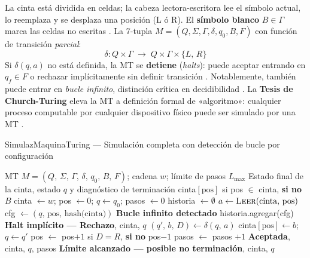 La cinta está dividida en celdas; la cabeza lectora-escritora lee el símbolo actual, lo
reemplaza y se desplaza una posición (L ó R). El \textbf{símbolo blanco} $B \in \Gamma$ marca
las celdas no escritas \cite{kelley2001}. La 7-tupla $M = (Q,\Sigma,\Gamma,\delta,q_0,B,F)$
con función de transición \emph{parcial}:
\[
  \delta: Q \times \Gamma \;\longrightarrow\; Q \times \Gamma \times \{L,\,R\}
\]
Si $\delta(q,a)$ no está definida, la MT se \textbf{detiene} (\emph{halts}): puede aceptar
entrando en $q_f \in F$ o rechazar implícitamente sin definir transición \cite{hopcroft2007es}.
Notablemente, también puede entrar en \emph{bucle infinito}, distinción crítica en decidibilidad
\cite{eugene2008}. La \textbf{Tesis de Church-Turing} eleva la MT a definición formal de
«algoritmo»: cualquier proceso computable por cualquier dispositivo físico puede ser simulado
por una MT \cite{sipser2012}.

\newpage
\begin{algobox}{SimulazMaquinaTuring — Simulación completa con detección de bucle por configuración}
\begin{algorithmic}[1]
  \Require MT $M = (Q,\,\Sigma,\,\Gamma,\,\delta,\,q_0,\,B,\,F)$;\;
           cadena $w$;\; límite de pasos $L_{\max}$
  \Ensure  Estado final de la cinta, estado $q$ y diagnóstico de terminación
  \State
    \State \Return cinta$[\text{pos}]$ si pos $\in$ cinta, \textbf{si no} $B$
  \EndFunction
  \State
  \State cinta $\gets w$;\; pos $\gets 0$;\; $q \gets q_0$;\; pasos $\gets 0$
  \State historia $\gets \emptyset$ 
    \State $a \gets \Call{Leer}{\text{cinta},\, \text{pos}}$
    \State cfg $\gets (q,\, \text{pos},\, \text{hash(cinta)})$
      \State \Return \textbf{Bucle infinito detectado} 
    \EndIf
    \State historia.agregar(cfg)
      \State \Return \textbf{Halt implícito — Rechazo}, cinta, $q$
    \EndIf
    \State $(q',\, b,\, D) \gets \delta(q,\, a)$
    \State cinta$[\text{pos}] \gets b$;\quad $q \gets q'$
    \State pos $\gets$ pos$+1$ si $D = R$, \textbf{si no} pos$-1$
    \State pasos $\gets$ pasos $+ 1$
  \EndWhile
  \State
    \State \Return \textbf{Aceptada}, cinta, $q$, pasos
  \Else
    \State \Return \textbf{Límite alcanzado — posible no terminación}, cinta, $q$
  \EndIf
\end{algorithmic}
\end{algobox}

